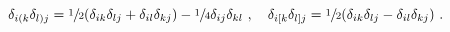 \begin{equation}
\delta_{i(k}\delta_{l)j}= \sfrac{1}{2}(\delta_{ik} 
\delta_{lj} +\delta_{il} \delta_{kj}) 
- \sfrac{1}{4}\delta_{ij}\delta_{kl} \ , \quad
\delta_{i[k}\delta_{l]j}= \sfrac{1}{2}(\delta_{ik} 
\delta_{lj} -\delta_{il} \delta_{kj})  \ .
\label{sdel}
\end{equation}


